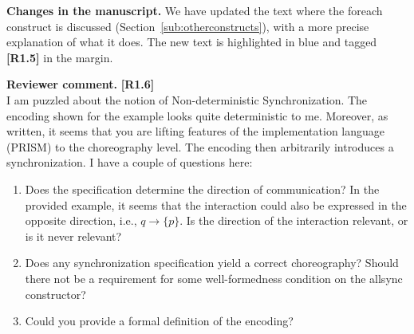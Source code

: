 \documentclass[11pt]{article}
\newcommand{\revcomment}[1]{%
  \begin{reviewercomment}
  \textbf{Reviewer comment.} #1
  \end{reviewercomment}
}
\newcommand{\revchanges}[2][]{%
  \par\noindent\textbf{Changes in the manuscript.} #1
  #2\par\bigskip
}
\begin{document}
\revchanges{ We have updated the text where the foreach construct is
  discussed (Section~\ref{sub:otherconstructs}), with a more precise
  explanation of what it does. The new text is highlighted in blue
  and tagged \textbf{[R1.5]} in the margin.}


\revcomment{\textbf{[R1.6]}\\
I am puzzled about the notion of Non-deterministic Synchronization.
The encoding shown for the example looks quite deterministic to me.
Moreover, as written, it seems that you are lifting features of the
implementation language (PRISM) to the choreography level. The
encoding then arbitrarily introduces a synchronization. I have a
couple of questions here:
  \begin{enumerate}
  \item Does the specification determine the direction of
    communication? In the provided example, it seems that the
    interaction could also be expressed in the opposite direction,
    i.e., $q \rightarrow \{p\}$. Is the direction of the interaction
    relevant, or is it never relevant?
  \item Does any synchronization specification yield a correct
    choreography? Should there not be a requirement for some
    well-formedness condition on the allsync constructor?
  \item Could you provide a formal definition of the encoding?
  \end{enumerate}
}
\end{document}

